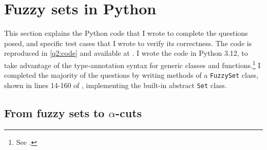 
\section{Fuzzy sets in Python}
\label{q2}

This section explains the Python code that I wrote to complete the questions posed, and
specific test cases that I wrote to verify its correctness.
The code is reproduced in \cref{q2:code} and available at
.
I wrote the code in Python 3.12, to take advantage of the type-annotation syntax for
generic classes and functions.\footnote{See
  .}
I completed the majority of the questions by writing methods of a \texttt{FuzzySet}
class, shown in lines 14-160 of , implementing the built-in abstract
\texttt{Set} class.

\subsection{From fuzzy sets to $\alpha$-cuts}
\label{q2:a}

